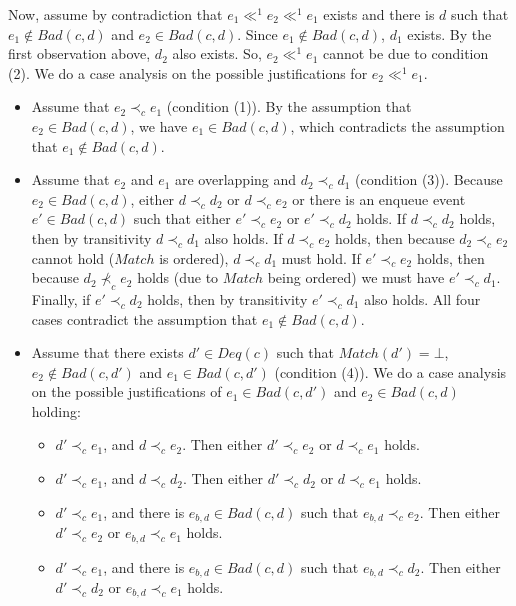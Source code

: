 \documentclass{LMCS}
\newcommand{\Match}{\ensuremath{\mathit{Match}}}
\newcommand{\Deq}[1]{\ensuremath{\mathit{Deq}({#1})}}
\newcommand{\Bad}[2]{\ensuremath{\mathit{Bad}(#1,#2)}}
\begin{document}
Now, assume by contradiction that $e_1\ll^1 e_2\ll^1 e_1$ exists and there is $d$ such that $e_1\notin \Bad c d$ and $e_2\in \Bad c d$.
Since $e_1\notin \Bad c d$, $d_1$ exists.
By the first observation above, $d_2$ also exists.
So, $e_2\ll^1 e_1$ cannot be due to condition (2).
We do a case analysis on the possible justifications for $e_2\ll^1 e_1$.
\begin{itemize}
\item Assume that $e_2\prec_c e_1$ (condition (1)). 
By the assumption that $e_2\in \Bad c d$, we have $e_1\in \Bad c d$, which contradicts the assumption that $e_1\notin \Bad c d$.

\item Assume that $e_2$ and $e_1$ are overlapping and $d_2\prec_c d_1$ (condition (3)).
Because $e_2\in \Bad c d$, either $d\prec_c d_2$ or $d\prec_c e_2$ or there is an enqueue event $e'\in \Bad c d$ such that either $e'\prec_c e_2$ or $e'\prec_c d_2$ holds.
If $d\prec_c d_2$ holds, then by transitivity $d\prec_c d_1$ also holds.
If $d\prec_c e_2$ holds, then because $d_2\prec_c e_2$ cannot hold ($\Match$ is ordered), $d\prec_c d_1$ must hold.
If $e'\prec_c e_2$ holds, then because $d_2\not\prec_c e_2$ holds (due to $\Match$ being ordered) we must have $e'\prec_c d_1$.
Finally, if $e'\prec_c d_2$ holds, then by transitivity $e'\prec_c d_1$ also holds.
All four cases contradict the assumption that $e_1\notin \Bad c d$.

\item Assume that there exists $d'\in \Deq c$ such that $\Match(d')=\bot$, $e_2\notin \Bad c {d'}$ and $e_1\in \Bad c {d'}$ (condition (4)).
We do a case analysis on the possible justifications of $e_1\in \Bad c {d'}$ and $e_2\in \Bad c d$ holding:
\begin{itemize}

\item $d'\prec_c e_1$, and $d\prec_c e_2$. 
Then either $d'\prec_c e_2$ or $d\prec_c e_1$ holds.

\item $d'\prec_c e_1$, and $d\prec_c d_2$.
Then either $d'\prec_c d_2$ or $d\prec_c e_1$ holds.

\item $d'\prec_c e_1$, and there is $e_{b,d}\in \Bad c d$ such that $e_{b,d}\prec_c e_2$.
Then either $d'\prec_c e_2$ or $e_{b,d}\prec_c e_1$ holds.

\item $d'\prec_c e_1$, and there is $e_{b,d}\in \Bad c d$ such that $e_{b,d}\prec_c d_2$.
Then either $d'\prec_c d_2$ or $e_{b,d}\prec_c e_1$ holds.


\end{itemize}
\end{itemize}
\end{document}
